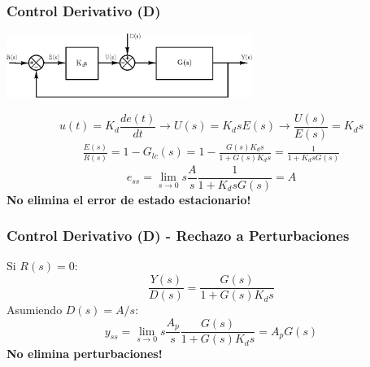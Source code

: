 \documentclass[aspectratio=169,handout]{beamer}
\theoremstyle{definition}
\theoremstyle{plain}
\theoremstyle{remark}
\begin{document}
\begin{frame}[<+->]\frametitle{Control Derivativo (D)}
\begin{center}
  \includegraphics[width=8cm]{images/Dcontroller.eps}
\end{center}
\pause
\begin{equation*}
  u(t) = K_d \frac{de(t)}{dt} \longrightarrow U(s) = K_d s E(s) \rightarrow \frac{U(s)}{E(s)} = K_d s
\end{equation*}
\pause
\begin{align*}
  \frac{E(s)}{R(s)} = 1 - G_{lc}(s) = 1 - \frac{G(s) K_d s}{1 + G(s) K_d s} = \frac{1}{1 + K_d s G(s)}
\end{align*}
\pause
\begin{equation*}
  e_{ss} = \lim_{s \rightarrow 0} s \frac{A}{s} \frac{1}{1 + K_d s G(s)} = A
\end{equation*}
\pause
\textbf{No elimina el error de estado estacionario!}
\end{frame}

\begin{frame}[<+->]\frametitle{Control Derivativo (D) - Rechazo a Perturbaciones}
Si $R(s) = 0$:
\begin{equation*}
  \frac{Y(s)}{D(s)} = \frac{G(s)}{1 + G(s) K_d s}
\end{equation*}
\pause
Asumiendo $D(s) = A/s$:
\begin{equation*}
  y_{ss} = \lim_{s \rightarrow 0} s \frac{A_p}{s} \frac{G(s)}{1 + G(s) K_d s} = A_p G(s)
\end{equation*}
\pause
\textbf{No elimina perturbaciones!}
\end{frame}
\end{document}
